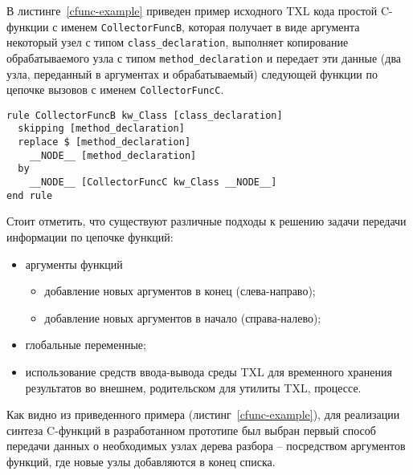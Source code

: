 В листинге~\ref{cfunc-example} приведен пример исходного TXL кода простой C-функции с именем \lstinline{CollectorFuncB}, которая получает в виде аргумента некоторый узел с типом \lstinline{class_declaration}, выполняет копирование обрабатываемого узла с типом \lstinline{method_declaration} и передает эти данные (два узла, переданный в аргументах и обрабатываемый) следующей функции по цепочке вызовов с именем \lstinline{CollectorFuncC}.

\begin{lstlisting}[frame=single, language=TXL, label={cfunc-example}, caption={Пример синтезированной C-функции.}]
rule CollectorFuncB kw_Class [class_declaration]
  skipping [method_declaration]
  replace $ [method_declaration]
    __NODE__ [method_declaration]
  by
    __NODE__ [CollectorFuncC kw_Class __NODE__]
end rule
\end{lstlisting}

Стоит отметить, что существуют различные подходы к решению задачи передачи информации по цепочке функций:
\begin {itemize}[noitemsep]
  \item аргументы функций
    \begin{itemize}[noitemsep]
      \item добавление новых аргументов в конец (слева-направо);
      \item добавление новых аргументов в начало (справа-налево);
    \end{itemize}
  \item глобальные переменные;
  \item использование средств ввода-вывода среды TXL для временного хранения результатов во внешнем, родительском для утилиты TXL, процессе.
\end{itemize}

Как видно из приведенного примера (листинг~\ref{cfunc-example}), для реализации синтеза C-функций в разработанном прототипе был выбран первый способ передачи данных о необходимых узлах дерева разбора -- посредством аргументов функций, где новые узлы добавляются в конец списка.

